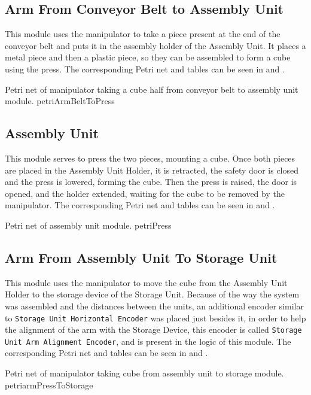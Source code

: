 \subsection{Arm From Conveyor Belt to Assembly Unit}
This module uses the manipulator to take a piece present at the end of the
conveyor belt and puts it in the assembly holder of the Assembly Unit. It places
a metal piece
and then a plastic piece, so they can be assembled to form a cube using the press.
The corresponding Petri net and tables can be seen in
 and .

\pagebreak

{Petri net of manipulator taking a cube half from conveyor belt to assembly unit
  module.}
{petriArmBeltToPress}
\subsection{Assembly Unit}
This module serves to press the two pieces, mounting a cube. Once both pieces
are placed in the Assembly Unit Holder, it is retracted, the safety door is
closed and the press is lowered, forming the cube. Then the press is raised, the
door is opened, and the holder extended, waiting for the cube to be removed by
the manipulator.
The corresponding Petri net and tables can be seen in
 and .



{Petri net of assembly unit module.}
{petriPress}
\subsection{Arm From Assembly Unit To Storage Unit}
This module uses the manipulator to move the cube from the Assembly Unit Holder
to the storage device of the Storage Unit. Because of the way the system was
assembled and the distances between the units, an additional encoder similar to \newline
\verb|Storage Unit Horizontal Encoder| was placed just besides it, in order to
help the alignment of the arm with the Storage Device, this encoder is called \newline
\verb|Storage Unit Arm Alignment Encoder|, and is present in the logic of this module.
The corresponding Petri net and tables can be seen in
 and .

\pagebreak

{Petri net of manipulator taking cube from assembly unit to storage module.}
{petriarmPressToStorage}
